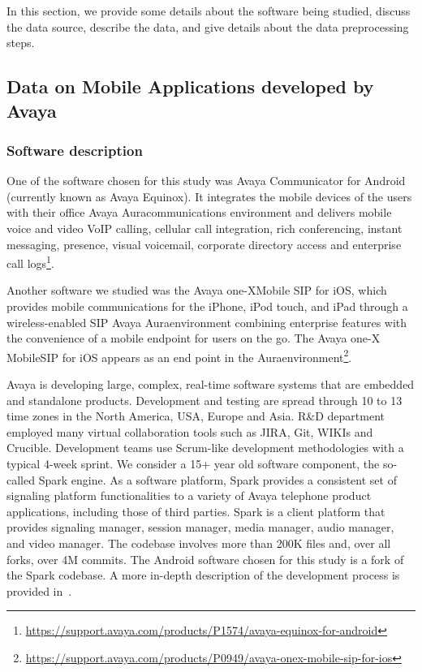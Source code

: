 \documentclass[smallcondensed]{svjour3}     %
\begin{document}
In this section, we provide some details about the software being studied, discuss the data source, describe the data, and give details about the data preprocessing steps.


\subsection{Data on Mobile Applications developed by Avaya}

\subsubsection{Software description}\label{sub:soft} 
One of the software chosen for this study was Avaya Communicator for
Android (currently known as Avaya Equinox\textregistered ). It
integrates the mobile devices of the users with their office Avaya
Aura\textregistered communications environment and delivers mobile
voice and video VoIP calling, cellular call integration, rich
conferencing, instant messaging, presence, visual voicemail,
corporate directory access and enterprise call logs\footnote{\url{https://support.avaya.com/products/P1574/avaya-equinox-for-android}}.

Another software we studied was the Avaya one-X\textregistered Mobile  SIP for  iOS, which provides mobile communications for the iPhone, iPod touch, and iPad through a wireless-enabled SIP Avaya Aura\textregistered environment combining enterprise features with the convenience of a mobile endpoint for users on the go. The Avaya one-X Mobile\textregistered SIP for iOS appears as an end point in the Aura\textregistered environment\footnote{\url{https://support.avaya.com/products/P0949/avaya-onex-mobile-sip-for-ios}}.

Avaya is developing large, complex, real-time software systems that
are embedded and standalone products. Development and testing are
spread through 10 to 13 time zones in the North America, USA, Europe
and Asia. R\&D department employed many virtual collaboration tools
such as JIRA, Git, WIKIs and Crucible. Development teams use
Scrum-like development methodologies with a typical 4-week
sprint. We consider a 15+ year old software component, the so-called
Spark engine.  As a software platform, Spark provides a consistent
set of signaling platform functionalities to a variety of Avaya
telephone product applications, including those of third parties.
Spark is a client platform that provides signaling manager, session
manager, media manager, audio manager, and video manager. The
codebase involves more than 200K files and, over all forks, over 4M
commits.  The Android software chosen for this study is a fork of
the Spark codebase. A more in-depth description of the development
process is provided in~\cite{amhp14}.
\end{document}
